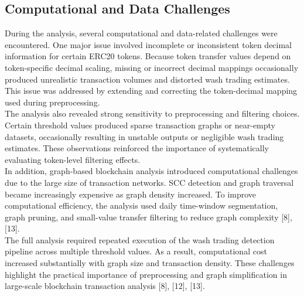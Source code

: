 \documentclass[language=english,thesis=bachelor,nosecondtitle,faculty=cb,onesided,12pt]{hsmw-thesis}
\begin{document}
	\subsection{Computational and Data Challenges}
During the analysis, several computational and data-related challenges were encountered. One major issue involved incomplete or inconsistent token decimal information for certain ERC20 tokens. Because token transfer values depend on token-specific decimal scaling, missing or incorrect decimal mappings occasionally produced unrealistic transaction volumes and distorted wash trading estimates. This issue was addressed by extending and correcting the token-decimal mapping used during preprocessing.\\
The analysis also revealed strong sensitivity to preprocessing and filtering choices. Certain threshold values produced sparse transaction graphs or near-empty datasets, occasionally resulting in unstable outputs or negligible wash trading estimates. These observations reinforced the importance of systematically evaluating token-level filtering effects.\\
In addition, graph-based blockchain analysis introduced computational challenges due to the large size of transaction networks. SCC detection and graph traversal became increasingly expensive as graph density increased. To improve computational efficiency, the analysis used daily time-window segmentation, graph pruning, and small-value transfer filtering to reduce graph complexity [8], [13].\\
The full analysis required repeated execution of the wash trading detection pipeline across multiple threshold values. As a result, computational cost increased substantially with graph size and transaction density. These challenges highlight the practical importance of preprocessing and graph simplification in large-scale blockchain transaction analysis [8], [12], [13].
\end{document}
